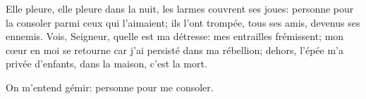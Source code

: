 Elle pleure, elle pleure dans la nuit, les larmes couvrent ses joues:
	personne pour la consoler parmi ceux qui l’aimaient;
	ils l’ont trompée, tous ses amis, devenus ses ennemis.
Vois, Seigneur, quelle est ma détresse: mes entrailles frémissent; mon cœur en moi se retourne car j’ai persisté dans ma rébellion; dehors, l’épée m’a privée d’enfants, dans la maison, c’est la mort.

On m’entend gémir: personne pour me consoler.